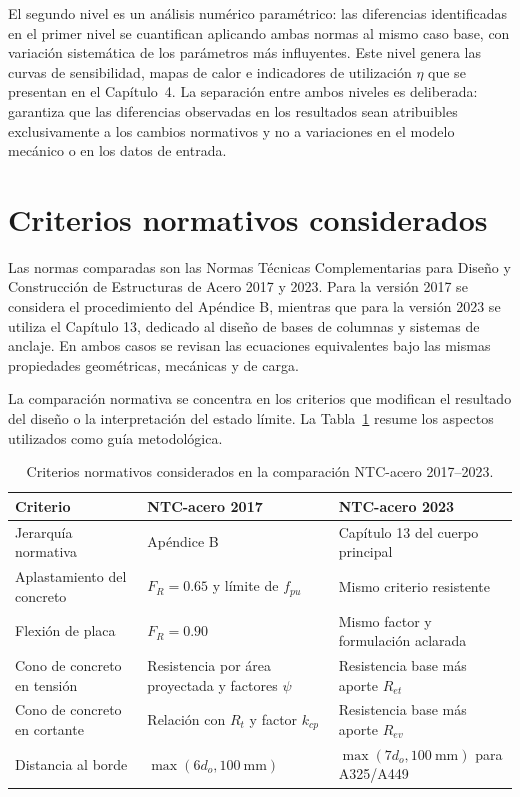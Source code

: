 El segundo nivel es un análisis numérico paramétrico: las diferencias identificadas en el primer
nivel se cuantifican aplicando ambas normas al mismo caso base, con variación sistemática de los
parámetros más influyentes. Este nivel genera las curvas de sensibilidad, mapas de calor e
indicadores de utilización $\eta$ que se presentan en el Capítulo~4. La separación entre ambos
niveles es deliberada: garantiza que las diferencias observadas en los resultados sean atribuibles
exclusivamente a los cambios normativos y no a variaciones en el modelo mecánico o en los datos de
entrada.

\section{Criterios normativos considerados}

Las normas comparadas son las Normas Técnicas Complementarias para Diseño y Construcción de
Estructuras de Acero 2017 y 2023. Para la versión 2017 se considera el procedimiento del Apéndice
B, mientras que para la versión 2023 se utiliza el Capítulo 13, dedicado al diseño de bases de
columnas y sistemas de anclaje. En ambos casos se revisan las ecuaciones equivalentes bajo las
mismas propiedades geométricas, mecánicas y de carga.

La comparación normativa se concentra en los criterios que modifican el resultado del diseño o la
interpretación del estado límite. La Tabla~\ref{tab:criterios_normativos_cap3} resume los
aspectos utilizados como guía metodológica.

\begin{table}[H]
  \centering
  \caption{Criterios normativos considerados en la comparación NTC-acero 2017--2023.}
  \label{tab:criterios_normativos_cap3}
  \begin{tabular}{p{} p{} p{}}
    \toprule
    \textbf{Criterio} & \textbf{NTC-acero 2017} & \textbf{NTC-acero 2023} \\
    \midrule
    Jerarquía normativa & Apéndice B & Capítulo 13 del cuerpo principal \\
    Aplastamiento del concreto & $F_R=0.65$ y límite de $f_{pu}$ & Mismo criterio resistente \\
    Flexión de placa & $F_R=0.90$ & Mismo factor y formulación aclarada \\
    Cono de concreto en tensión & Resistencia por área proyectada y factores $\psi$ & Resistencia base más aporte $R_{et}$ \\
    Cono de concreto en cortante & Relación con $R_t$ y factor $k_{cp}$ & Resistencia base más aporte $R_{ev}$ \\
    Distancia al borde & $\max(6d_o,100~\mathrm{mm})$ & $\max(7d_o,100~\mathrm{mm})$ para A325/A449 \\
    \bottomrule
  \end{tabular}
\end{table}

